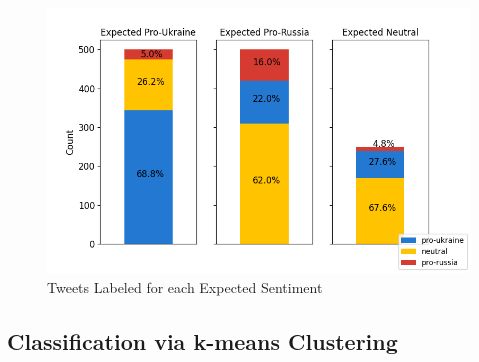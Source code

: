 \documentclass[12pt,letterpaper,oneside,titlepage]{article}
\begin{document}
\begin{figure}[ht]
    \centering
    \includegraphics[scale=0.65]{biclass-sia}
    \captionsetup{justification=centering}
    \caption{Tweets Labeled for each Expected Sentiment}
\end{figure}
\FloatBarrier

\pagebreak

\subsection{Classification via k-means Clustering}\label{subsec:classification-via-clustering}
\end{document}
